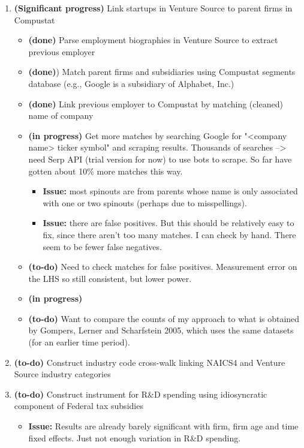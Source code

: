 \documentclass[12pt,english]{article}
\theoremstyle{remark}
\begin{document}
\begin{enumerate}
	\item \textbf{(Significant progress)} Link startups in Venture Source to parent firms in Compustat
	\begin{itemize}
		\item \textbf{(done)} Parse employment biographies in Venture Source to extract previous employer 
		\item \textbf{(done)}) Match parent firms and subsidiaries using Compustat segments database (e.g., Google is a subsidiary of Alphabet, Inc.) 
		\item \textbf{(done)} Link previous employer to Compustat by matching (cleaned) name of company 
		\item \textbf{(in progress)} Get more matches by searching Google for "<company name> ticker symbol" and scraping results. Thousands of searches --> need Serp API (trial version for now) to use bots to scrape. So far have gotten about 10\% more matches this way. 
		\begin{itemize}
			\item \textbf{Issue: } most spinouts are from parents whose name is only associated with one or two spinouts (perhaps due to misspellings).
			\item \textbf{Issue: } there are false positives. But this should be relatively easy to fix, since there aren't too many matches. I can check by hand. There seem to be fewer false negatives.
		\end{itemize} 
		\item \textbf{(to-do)} Need to check matches for false positives. Measurement error on the LHS so still consistent, but lower power. 
		\item \textbf{(in progress)} 
		\item \textbf{(to-do)} Want to compare the counts of my approach to what is obtained by Gompers, Lerner and Scharfstein 2005, which uses the same datasets (for an earlier time period). 
	\end{itemize}
	\item \textbf{(to-do)} Construct industry code cross-walk linking NAICS4 and Venture Source industry categories
	\item \textbf{(to-do)} Construct instrument for R\&D spending using idiosyncratic component of Federal tax subsidies
	\begin{itemize}
		\item \textbf{Issue: } Results are already barely significant with firm, firm age and time fixed effects. Just not enough variation in R\&D spending. 

\end{itemize}
\end{enumerate}
\end{document}
